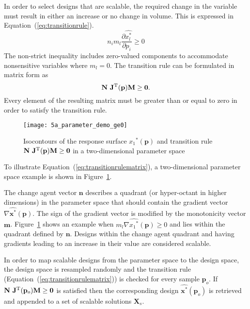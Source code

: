 In order to select designs that are scalable, the required change in the variable must result in either an increase or no change in volume. This is expressed in Equation~(\ref{eq:transitionrule}). 
\begin{equation}
	n_i m_l\dfrac{\partial \hat{x_l^*}}{\partial p_i} \ge 0 \label{eq:transitionrule}
\end{equation}
The non-strict inequality includes zero-valued components to accommodate nonsensitive variables where $m_l = 0$. The transition rule can be formulated in matrix form as 
\begin{equation}
		\mathbf{N}~\mathbf{J}^{\text T}(\mathbf{p})\mathbf{M} \ge \mathbf{0}.
		 \label{eq:transitionrulematrix}
\end{equation}
Every element of the resulting matrix must be greater than or equal to zero in order to satisfy the transition rule.

\begin{figure}[h!]
	\centering
	\texttt{[image: 5a\_parameter\_demo\_ge0]}
	\caption{Isocontours of the response surface ${x_1}^*(\mathbf{p})$ and transition rule $\mathbf{N}~\mathbf{J}^{\text T}(\mathbf{p})\mathbf{M} \ge \mathbf{0}$ in a two-dimensional parameter space}
	\label{fig:contourdemo}
\end{figure}

To illustrate Equation~(\ref{eq:transitionrulematrix}), a two-dimensional parameter space example is shown in Figure~\ref{fig:contourdemo}. 

The change agent vector $\mathbf{n}$ describes a quadrant (or hyper-octant in higher dimensions) in the parameter space that should contain the gradient vector $\nabla\hat{\mathbf{x}^*}(\mathbf{p})$. The sign of the gradient vector is modified by the monotonicity vector $\mathbf{m}$. Figure~\ref{fig:contourdemo} shows an example when $m_l\nabla\hat{{x_1}^*}(\mathbf{p}) \ge 0$ and lies within the quadrant defined by $\mathbf{n}$. Designs within the change agent quadrant and having gradients leading to an increase in their value are considered scalable.

In order to map scalable designs from the parameter space to the design space, the design space is resampled randomly and the transition rule (Equation~(\ref{eq:transitionrulematrix})) is checked for every sample $\mathbf{p}_o$. If $\mathbf{N}~\mathbf{J}^{\text T}(\mathbf{p}_o)\mathbf{M} \ge \mathbf{0}$ is satisfied then the corresponding design $\hat{\mathbf{x}^*}(\mathbf{p}_o)$ is retrieved and appended to a set of scalable solutions $\mathbf{X}_s$.

